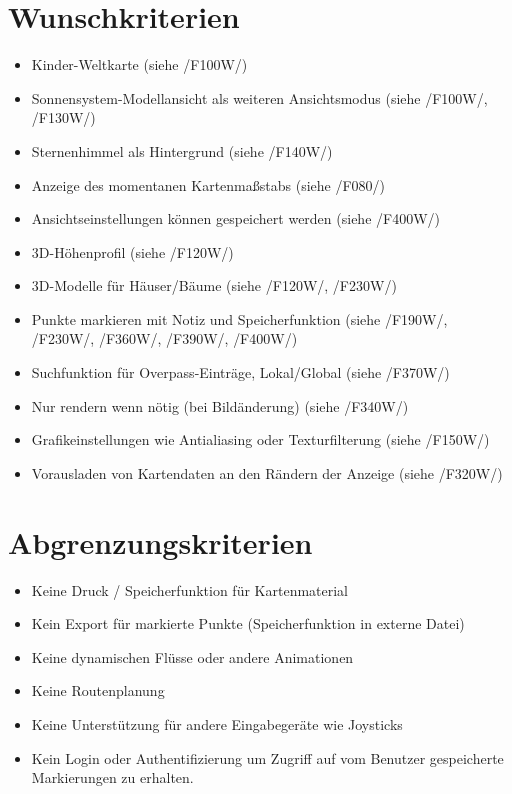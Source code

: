 \documentclass[10pt]{scrreprt}
\newcommand{\ziel}[1]{{\fontsize{9.5}{11}\textsf{/#1/}}}
\begin{document}
\section{Wunschkriterien}
\begin{itemize}
\item Kinder-Weltkarte (siehe \ziel{F100W})
\item Sonnensystem-Modellansicht als weiteren Ansichtsmodus (siehe \ziel{F100W}, \ziel{F130W})
\item Sternenhimmel als Hintergrund (siehe \ziel{F140W})
\item Anzeige des momentanen Kartenmaßstabs (siehe \ziel{F080})
\item Ansichtseinstellungen können gespeichert werden (siehe \ziel{F400W})
\item 3D-Höhenprofil (siehe \ziel{F120W})
\item 3D-Modelle für Häuser/Bäume (siehe \ziel{F120W}, \ziel{F230W})
\item Punkte markieren mit Notiz und Speicherfunktion (siehe \ziel{F190W}, \ziel{F230W}, \ziel{F360W}, \ziel{F390W}, \ziel{F400W})
\item Suchfunktion für Overpass-Einträge, Lokal/Global (siehe \ziel{F370W})
\item Nur rendern wenn nötig (bei Bildänderung) (siehe \ziel{F340W})
\item Grafikeinstellungen wie Antialiasing oder Texturfilterung (siehe \ziel{F150W})
\item Vorausladen von Kartendaten an den Rändern der Anzeige (siehe \ziel{F320W})
\end{itemize}

\section{Abgrenzungskriterien}
\begin{itemize}
\item Keine Druck / Speicherfunktion für Kartenmaterial
\item Kein Export für markierte Punkte (Speicherfunktion in externe Datei)
\item Keine dynamischen Flüsse oder andere Animationen
\item Keine Routenplanung
\item Keine Unterstützung für andere Eingabegeräte wie Joysticks
\item Kein Login oder Authentifizierung um Zugriff auf vom Benutzer gespeicherte Markierungen zu erhalten.
\end{itemize}
\end{document}
